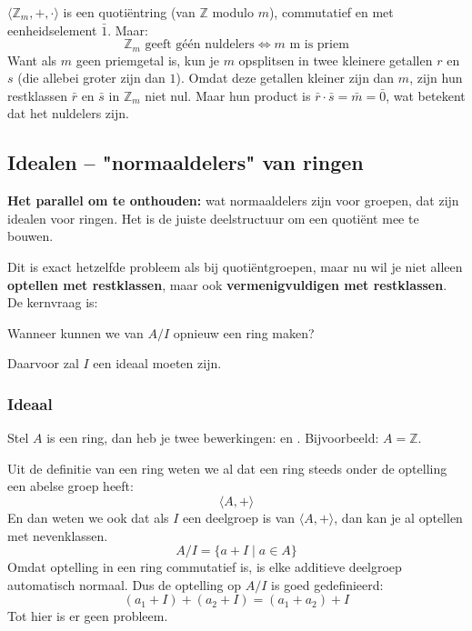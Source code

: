 \textbf{} $\langle \mathbb{Z}_m, +, \cdot \rangle$ is een quotiëntring (van $\mathbb{Z}$ modulo $m$), commutatief en met eenheidselement $\bar{1}$. Maar:
\begin{equation*}
    \mathbb{Z}_m \text{ geeft géén nuldelers} \iff m \text{ m is priem}
\end{equation*}
Want als $m$ geen priemgetal is, kun je $m$ opsplitsen in twee kleinere getallen $r$ en $s$ (die allebei groter zijn dan $1$). Omdat deze getallen kleiner zijn dan $m$, zijn hun restklassen $\bar{r}$ en $\bar{s}$ in $\mathbb{Z}_m$ niet nul. Maar hun product is $\bar{r} \cdot \bar{s} = \bar{m} = \bar{0}$, wat betekent dat het nuldelers zijn.

\subsection{Idealen -- "normaaldelers" van ringen}

\begin{barbox}[WildStrawberry][gray!3]
    \textcolor{WildStrawberry}{\textbf{Het parallel om te onthouden:}} wat normaaldelers zijn voor groepen, dat zijn idealen voor ringen. Het is de juiste deelstructuur om een quotiënt mee te bouwen.
\end{barbox}

Dit is exact hetzelfde probleem als bij quotiëntgroepen, maar nu wil je niet alleen \textbf{optellen met restklassen}, maar ook \textbf{vermenigvuldigen met restklassen}. De kernvraag is:
\begin{center}
    Wanneer kunnen we van $A/I$ opnieuw een ring maken?
\end{center}
Daarvoor zal $I$ een ideaal moeten zijn.

\subsubsection{Ideaal}


Stel $A$ is een ring, dan heb je twee bewerkingen: \inlinetext{+} en \inlinetext{$\cdot$}. Bijvoorbeeld: $A = \mathbb{Z}$.

Uit de definitie van een ring weten we al dat een ring steeds onder de optelling een abelse groep heeft:
\begin{equation*}
    \langle A,+ \rangle
\end{equation*}
En dan weten we ook dat als $I$ een deelgroep is van $\langle A,+ \rangle$, dan kan je al optellen met nevenklassen.
\begin{equation*}
    A/I = \{a + I \mid a \in A\}
\end{equation*}
Omdat optelling in een ring commutatief is, is elke additieve deelgroep automatisch normaal. Dus de optelling op $A/I$ is goed gedefinieerd:
\begin{equation*}
    (a_1 + I) + (a_2 + I) = (a_1 + a_2) + I
\end{equation*}
Tot hier is er geen probleem.

